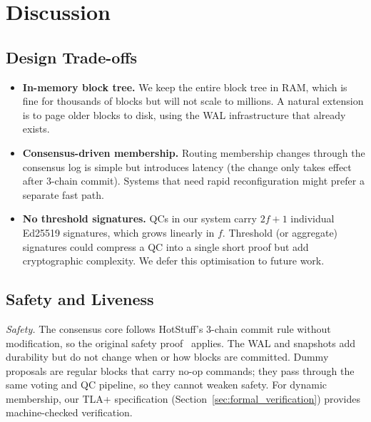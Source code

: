 \chapter{Discussion}
\label{sec:discussion}

\section{Design Trade-offs}

\begin{itemize}
  \item \textbf{In-memory block tree.}  We keep the entire block tree in RAM, which is fine
    for thousands of blocks but will not scale to millions.  A natural extension is to page
    older blocks to disk, using the WAL infrastructure that already exists.

  \item \textbf{Consensus-driven membership.}  Routing membership changes through the
    consensus log is simple but introduces latency (the change only takes effect after
    3-chain commit).  Systems that need rapid reconfiguration might prefer a separate fast
    path.

  \item \textbf{No threshold signatures.}  QCs in our system carry $2f{+}1$ individual
    Ed25519 signatures, which grows linearly in $f$.  Threshold (or aggregate) signatures
    could compress a QC into a single short proof but add cryptographic complexity.  We
    defer this optimisation to future work.
\end{itemize}

\section{Safety and Liveness}

\textit{Safety.} The consensus core follows HotStuff's 3-chain commit rule without
modification, so the original safety proof~\cite{hotstuff2019} applies.  The WAL and
snapshots add durability but do not change when or how blocks are committed.  Dummy
proposals are regular blocks that carry no-op commands; they pass through the same voting
and QC pipeline, so they cannot weaken safety.  For dynamic membership, our TLA+
specification (Section~\ref{sec:formal_verification}) provides machine-checked verification.

